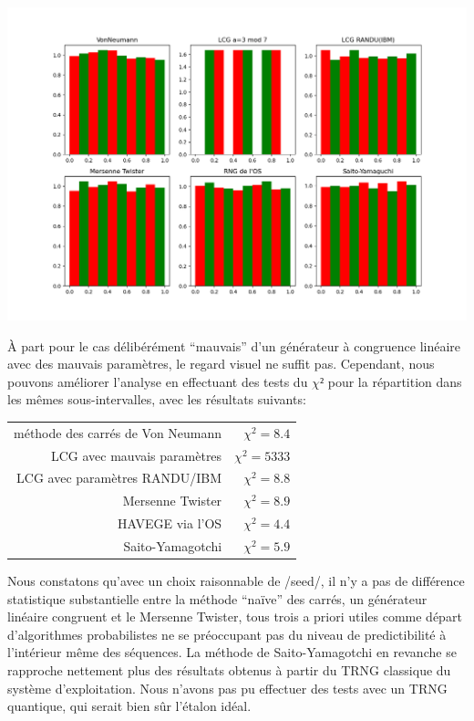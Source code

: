 \documentclass{scrartcl}
\begin{document}
\begin{center}
  \includegraphics[width=\textwidth]{img/rng8000b.png}
\end{center}
À part pour le cas délibérément ``mauvais'' d'un générateur
à congruence linéaire avec des mauvais paramètres, le regard visuel ne suffit
pas. Cependant, nous pouvons améliorer l'analyse en effectuant des tests du
$\chi²$ pour la répartition dans les mêmes sous-intervalles, avec les résultats
suivants:
\begin{center}
  \begin{tabular}{rr}
    méthode des carrés de Von Neumann& {$\chi^2 = 8.4$}\\
    LCG avec mauvais paramètres& {$\chi^2 = 5333$}\\
    LCG avec paramètres RANDU/IBM& {$\chi^2 = 8.8$}\\
    Mersenne Twister& {$\chi^2 = 8.9$}\\
    HAVEGE via l'OS& {$\chi^2 = 4.4$}\\
    Saito-Yamagotchi& {$\chi^2 = 5.9$}
  \end{tabular}
\end{center}

Nous constatons qu'avec un choix raisonnable de /seed/, il n'y a pas de
différence statistique substantielle entre la méthode ``naïve'' des carrés, un
générateur linéaire congruent et le Mersenne Twister, tous trois a priori utiles
comme départ d'algorithmes probabilistes ne se préoccupant pas du niveau de
predictibilité à l'intérieur même des séquences.  La méthode de Saito-Yamagotchi
en revanche se rapproche nettement plus des résultats obtenus à partir du TRNG
classique du système d'exploitation. Nous n'avons pas pu effectuer des tests
avec un TRNG quantique, qui serait bien sûr l'étalon idéal.
\end{document}
